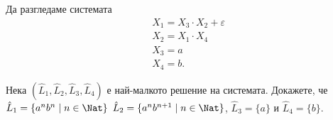 \begin{example}
  Да разгледаме системата
  \begin{align*}
    & X_1 = X_3 \cdot X_2 + \varepsilon\\
    & X_2 = X_1 \cdot X_4\\
    & X_3 = a\\
    & X_4 = b.
  \end{align*}


  Нека $(\hat{L}_1, \hat{L}_2, \hat{L}_3, \hat{L}_4)$ е най-малкото решение на системата.
  Докажете, че $\hat{L}_1 = \{a^nb^n\mid n \in \Nat\}$ $\hat{L}_2 = \{a^nb^{n+1}\mid n \in \Nat\}$,
  $\hat{L}_3 = \{a\}$ и $\hat{L}_4 = \{b\}$.
\end{example}


